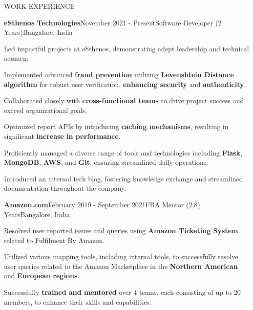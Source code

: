 \documentclass{resume} %
\begin{document}
{ 
  
}


\begin{rSection}{WORK EXPERIENCE}

    \begin{rSubsection}{\textbf{eSthenos Technologies}}{November 2021 - Present}{Software Developer (2 Years)}{Bangalore, India}
        \item  Led impactful projects at eSthenos, demonstrating adept leadership and technical acumen.

        \item Implemented advanced \textbf{fraud prevention} utilizing \textbf{Levenshtein Distance algorithm} for robust user verification, \textbf{enhancing security} and \textbf{authenticity}.
\item Collaborated closely with \textbf{cross-functional teams} to drive project success and exceed organizational goals.
        \item  Optimized report APIs by introducing \textbf{caching mechanisms}, resulting in significant \textbf{increase in performance}.

        \item  Proficiently managed a diverse range of tools and technologies including \textbf{Flask}, \textbf{MongoDB}, \textbf{AWS}, and \textbf{Git}, ensuring streamlined daily operations.
\item  Introduced an internal tech blog, fostering knowledge exchange and streamlined documentation throughout the company.

    \end{rSubsection}
    
    \begin{rSubsection}{\textbf{Amazon.com}}{February 2019 - September 2021}{FBA Mentor (2.8) Years}{Bangalore, India}
        \item  Resolved user reported issues and queries using \textbf{Amazon Ticketing System} related to Fulfilment By Amazon.
        \item Utilized various mapping tools, including internal tools, to successfully resolve user queries related to the Amazon Marketplace in the \textbf{Northern American} and \textbf{European regions}.
        \item Successfully \textbf{trained and mentored} over 4 teams, each consisting of up to 20 members, to enhance their skills and capabilities.
    \end{rSubsection}
    
\end{rSection}
\end{document}
